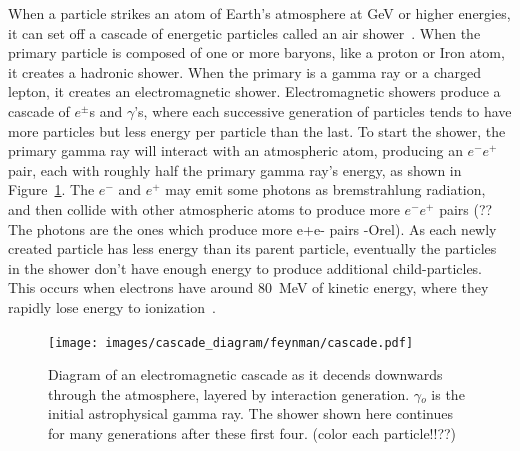   When a particle strikes an atom of Earth's atmosphere at GeV or higher energies, it can set off a cascade of energetic particles called an air shower~\cite{Bethe1934,Klein1999}.
  When the primary particle is composed of one or more baryons, like a proton or Iron atom, it creates a hadronic shower.
  When the primary is a gamma ray or a charged lepton, it creates an electromagnetic shower.
  Electromagnetic showers produce a cascade of $e^{\pm}$s and $\gamma$'s, where each successive generation of particles tends to have more particles but less energy per particle than the last.
  To start the shower, the primary gamma ray will interact with an atmospheric atom, producing an $e^{-}e^{+}$ pair, each with roughly half the primary gamma ray's energy, as shown in Figure~\ref{fig:emcascade}.
  The $e^{-}$ and $e^{+}$ may emit some photons as bremstrahlung radiation, and then {\color{red}collide with other atmospheric atoms to produce more $e^{-}e^{+}$ pairs (?? The photons are the ones which produce more e+e- pairs -Orel)}.
  As each newly created particle has less energy than its parent particle, eventually the particles in the shower don't have enough energy to produce additional child-particles.
  This occurs when electrons have around \SI{80}{MeV} of kinetic energy, where they rapidly lose energy to ionization~\cite{pdg_2014}.


  \begin{figure}[ht]
    \centering
    \texttt{[image: images/cascade\_diagram/feynman/cascade.pdf]}
    \caption[Electromagnetic Cascade]{
      Diagram of an electromagnetic cascade as it decends downwards through the atmosphere, layered by interaction generation.
      $\gamma{}_o$ is the initial astrophysical gamma ray.
      The shower shown here continues for many generations after these first four.
      {\color{red}(color each particle!!??)}
    }
    \label{fig:emcascade}
  \end{figure}

